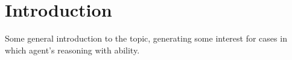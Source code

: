 
\chapter{Introduction}
\label{cha:introduction}


\begin{note}
  \color{red}
  Some general introduction to the topic, generating some interest for cases in which agent's reasoning with ability.
\end{note}

